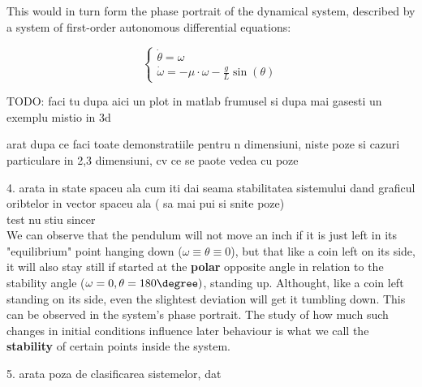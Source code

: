 This would in turn form the phase portrait of the dynamical system, described by a system of first-order autonomous differential equations:

\[
    \begin{cases}
        \dot{\theta}  = \omega \\
        \dot{\omega} = -\mu \cdot \omega - \frac{g}{L}\sin(\theta)
    \end{cases}
\]

\par
TODO: faci tu dupa aici un plot in matlab frumusel
si dupa mai gasesti un exemplu mistio in 3d

arat dupa ce faci toate demonstratiile pentru n dimensiuni, niste poze si cazuri particulare in 2,3 dimensiuni, cv ce se paote vedea cu poze



4. arata in state spaceu ala cum iti dai seama stabilitatea sistemului dand graficul oribtelor in vector spaceu ala ( sa mai pui si snite poze)\\

test nu stiu sincer \\
We can observe that the pendulum will not move an inch if it is just left in its "equilibrium" point hanging down ($\omega \equiv \theta \equiv 0$), but that like a coin left on its side, it will also stay still if started at the \textbf{polar} opposite angle in relation to the stability angle ($\omega =0 , \theta = 180 \degree)$, standing up.
Althought, like a coin left standing on its side, even the slightest deviation will get it tumbling down. This can be observed in the system's phase portrait. The study of how much such changes in initial conditions influence later behaviour is what we call the \textbf{stability} of certain points inside the system.

5. arata poza de clasificarea sistemelor, dat \\



